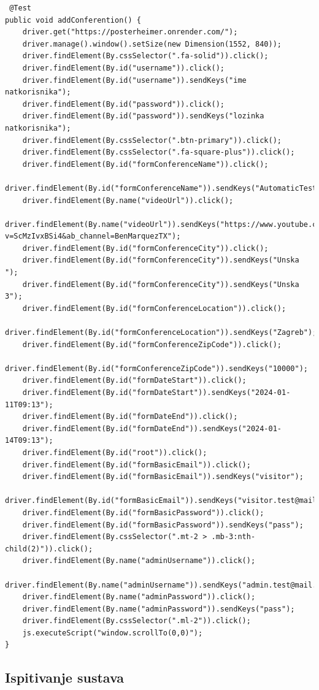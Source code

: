 	\begin{lstlisting}
 @Test
public void addConferention() {
	driver.get("https://posterheimer.onrender.com/");
	driver.manage().window().setSize(new Dimension(1552, 840));
	driver.findElement(By.cssSelector(".fa-solid")).click();
	driver.findElement(By.id("username")).click();
	driver.findElement(By.id("username")).sendKeys("ime natkorisnika");
	driver.findElement(By.id("password")).click();
	driver.findElement(By.id("password")).sendKeys("lozinka natkorisnika");
	driver.findElement(By.cssSelector(".btn-primary")).click();
	driver.findElement(By.cssSelector(".fa-square-plus")).click();
	driver.findElement(By.id("formConferenceName")).click();
	driver.findElement(By.id("formConferenceName")).sendKeys("AutomaticTestKonferencija");
	driver.findElement(By.name("videoUrl")).click();
	driver.findElement(By.name("videoUrl")).sendKeys("https://www.youtube.com/watch?v=ScMzIvxBSi4&ab_channel=BenMarquezTX");
	driver.findElement(By.id("formConferenceCity")).click();
	driver.findElement(By.id("formConferenceCity")).sendKeys("Unska ");
	driver.findElement(By.id("formConferenceCity")).sendKeys("Unska 3");
	driver.findElement(By.id("formConferenceLocation")).click();
	driver.findElement(By.id("formConferenceLocation")).sendKeys("Zagreb");
	driver.findElement(By.id("formConferenceZipCode")).click();
	driver.findElement(By.id("formConferenceZipCode")).sendKeys("10000");
	driver.findElement(By.id("formDateStart")).click();
	driver.findElement(By.id("formDateStart")).sendKeys("2024-01-11T09:13");
	driver.findElement(By.id("formDateEnd")).click();
	driver.findElement(By.id("formDateEnd")).sendKeys("2024-01-14T09:13");
	driver.findElement(By.id("root")).click();
	driver.findElement(By.id("formBasicEmail")).click();
	driver.findElement(By.id("formBasicEmail")).sendKeys("visitor");
	driver.findElement(By.id("formBasicEmail")).sendKeys("visitor.test@mail.hr");
	driver.findElement(By.id("formBasicPassword")).click();
	driver.findElement(By.id("formBasicPassword")).sendKeys("pass");
	driver.findElement(By.cssSelector(".mt-2 > .mb-3:nth-child(2)")).click();
	driver.findElement(By.name("adminUsername")).click();
	driver.findElement(By.name("adminUsername")).sendKeys("admin.test@mail.hr");
	driver.findElement(By.name("adminPassword")).click();
	driver.findElement(By.name("adminPassword")).sendKeys("pass");
	driver.findElement(By.cssSelector(".ml-2")).click();
	js.executeScript("window.scrollTo(0,0)");
}
	\end{lstlisting}
			
			
			\subsection{Ispitivanje sustava}
			
